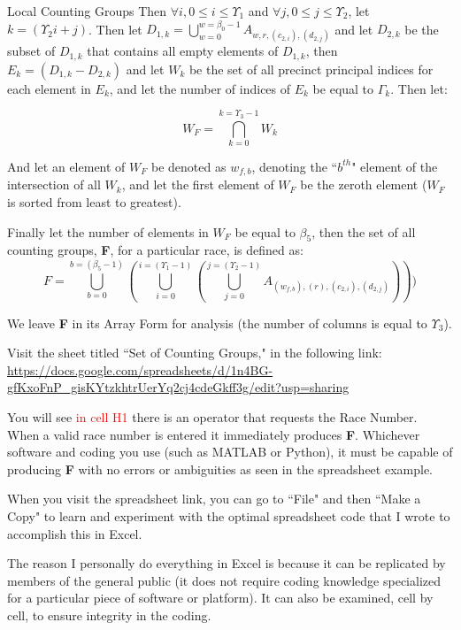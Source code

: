 \begin{definition}{Local Counting Groups}
Then $\forall i, 0 \le i \le \Upsilon_{1}$ and $\forall j, 0 \le j \le \Upsilon_{2}$, let $k=(\Upsilon_{2}i+j)$.
\newpage
Then let $D_{1,k}=\bigcup_{w=0}^{w=\beta_{0}-1}A_{w,r,(c_{2,i}),(d_{2,j})}$ and let $D_{2,k}$ be the subset of $D_{1,k}$ that contains all empty elements of $D_{1,k}$, then $E_{k}=(D_{1,k}-D_{2,k})$ and let $W_{k}$ be the set of all precinct principal indices for each element in $E_{k}$, and let the number of indices of $E_{k}$ be equal to $\Gamma_{k}$. Then let:

$$W_{F} = \bigcap_{k=0}^{k=\Upsilon_{3}-1}W_{k}$$

And let an element of $W_{F}$ be denoted as $w_{f,b}$, denoting the ``$b^{th}$" element of the intersection of all $W_{k}$, and let the first element of $W_{F}$ be the zeroth element ($W_{F}$ is sorted from least to greatest).

Finally let the number of elements in $W_{F}$ be equal to $\beta_{5}$, then the set of all counting groups, \textbf{F}, for a particular race, is defined as:
$$F=\bigcup_{b=0}^{b=(\beta_{5}-1)}(\bigcup_{i=0}^{i=(\Upsilon_{1}-1)}(\bigcup_{j=0}^{j=(\Upsilon_{2}-1)}A_{(w_{f,b}),(r),(c_{2,i}),(d_{2,j})})))$$

We leave \textbf{F} in its Array Form for analysis (the number of columns is equal to $\Upsilon_{3}$).
\end{definition}

Visit the sheet titled ``Set of Counting Groups," in the following link: \url{https://docs.google.com/spreadsheets/d/1n4BG-gfKxoFnP_gisKYtzkhtrUerYq2cj4cdeGkff3g/edit?usp=sharing}

You will see \textcolor{red}{in cell H1} there is an operator that requests the Race Number. When a valid race number is entered it immediately produces \textbf{F}.  Whichever software and coding you use (such as MATLAB or Python), it must be capable of producing \textbf{F} with no errors or ambiguities as seen in the spreadsheet example.

When you visit the spreadsheet link, you can go to ``File" and then ``Make a Copy" to learn and experiment with the optimal spreadsheet code that I wrote to accomplish this in Excel. 

The reason I personally do everything in Excel is because it can be replicated by members of the general public (it does not require coding knowledge specialized for a particular piece of software or platform). It can also be examined, cell by cell, to ensure integrity in the coding.

